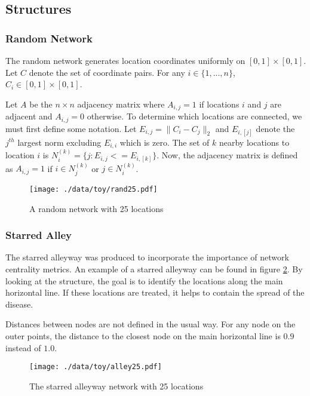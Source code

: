 \documentclass[11pt]{article}
\begin{document}
\subsection{Structures}
\label{sec-1-3}

\subsubsection{Random Network}
\label{sec-1-3-1}

The random network generates location coordinates uniformly on $[0,1]
\times [0,1]$.  Let $C$ denote the set of coordinate pairs.  For any
$i \in \lbrace 1,...,n \rbrace$, $C_{i} \in [0,1] \times [0,1]$.

Let $A$ be the $n \times n$ adjacency matrix where $A_{i,j} = 1$ if
locations $i$ and $j$ are adjacent and $A_{i,j} = 0$ otherwise.  To
determine which locations are connected, we must first define some
notation.  Let $E_{i,j} = \|C_{i} - C_{j}\|_2$ and $E_{i,[j]}$ denote
the $j^{th}$ largest norm excluding $E_{i,i}$ which is zero.  The set
of $k$ nearby locations to location $i$ is $N^{(k)}_i = \lbrace j :
E_{i,j} <= E_{i,[k]} \rbrace$.  Now, the adjacency matrix is defined
as $A_{i,j} = 1$ if $i \in N_{j}^{(k)}$ or $j \in N_{i}^{(k)}$.


\begin{figure}[htb]
\centering
\texttt{[image: ./data/toy/rand25.pdf]}
\caption{\label{fig:rand25}A random network with 25 locations}
\end{figure}



\subsubsection{Starred Alley}
\label{sec-1-3-2}

The starred alleyway was produced to incorporate the importance of
network centrality metrics.  An example of a starred alleyway can be
found in figure \ref{fig:alley25}.  By looking at the structure, the goal is
to identify the locations along the main horizontal line.  If these
locations are treated, it helps to contain the spread of the disease.

Distances between nodes are not defined in the usual way.  For any
node on the outer points, the distance to the closest node on the main
horizontal line is $0.9$ instead of $1.0$.


\begin{figure}[htb]
\centering
\texttt{[image: ./data/toy/alley25.pdf]}
\caption{\label{fig:alley25}The starred alleyway network with 25 locations}
\end{figure}
\end{document}
